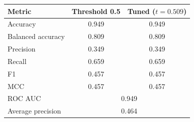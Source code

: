 \begin{tabular}{lcc}
\toprule
Metric & Threshold 0.5 & Tuned ($t = 0.509$) \\
\midrule
Accuracy & 0.949 & 0.949 \\
Balanced accuracy & 0.809 & 0.809 \\
Precision & 0.349 & 0.349 \\
Recall & 0.659 & 0.659 \\
F1 & 0.457 & 0.457 \\
MCC & 0.457 & 0.457 \\
\midrule
ROC AUC & \multicolumn{2}{c}{0.949} \\
Average precision & \multicolumn{2}{c}{0.464} \\
\bottomrule
\end{tabular}
